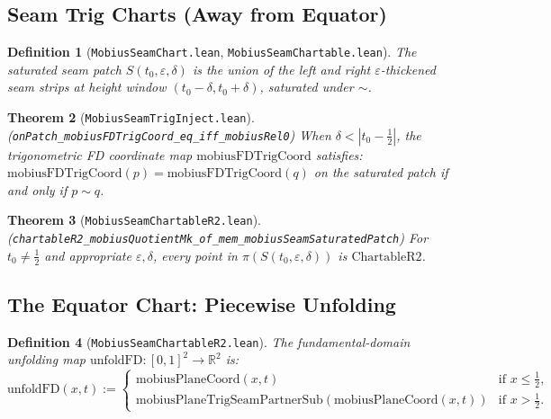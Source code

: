 \documentclass[11pt]{article}
\newtheorem{theorem}{Theorem}[section]
\newtheorem{definition}[theorem]{Definition}
\newcommand{\leanref}[1]{\texttt{\small #1}}
\begin{document}
\subsection{Seam Trig Charts (Away from Equator)}

\begin{definition}[\leanref{MobiusSeamChart.lean}, \leanref{MobiusSeamChartable.lean}]
The \emph{saturated seam patch} $S(t_0, \varepsilon, \delta)$ is the union of the left and right $\varepsilon$-thickened seam strips at height window $(t_0 - \delta, t_0 + \delta)$, saturated under $\sim$.
\end{definition}

\begin{theorem}[\leanref{MobiusSeamTrigInject.lean}]
\label{thm:trig-inject}
(\leanref{onPatch\_mobiusFDTrigCoord\_eq\_iff\_mobiusRel0})
When $\delta < |t_0 - \tfrac{1}{2}|$, the trigonometric FD coordinate map $\mathrm{mobiusFDTrigCoord}$ satisfies: $\mathrm{mobiusFDTrigCoord}(p) = \mathrm{mobiusFDTrigCoord}(q)$ on the saturated patch if and only if $p \sim q$.
\end{theorem}

\begin{theorem}[\leanref{MobiusSeamChartableR2.lean}]
\label{thm:seam-trig}
(\leanref{chartableR2\_mobiusQuotientMk\_of\_mem\_mobiusSeamSaturatedPatch})
For $t_0 \neq \tfrac{1}{2}$ and appropriate $\varepsilon, \delta$, every point in $\pi(S(t_0, \varepsilon, \delta))$ is $\mathrm{ChartableR2}$.
\end{theorem}


\subsection{The Equator Chart: Piecewise Unfolding}
\label{sec:equator}


\begin{definition}[\leanref{MobiusSeamChartableR2.lean}]
\label{def:unfold}
The \emph{fundamental-domain unfolding map} $\mathrm{unfoldFD} : [0,1]^2 \to \mathbb{R}^2$ is:
\[
  \mathrm{unfoldFD}(x, t) :=
  \begin{cases}
    \mathrm{mobiusPlaneCoord}(x, t) & \text{if } x \leq \tfrac{1}{2}, \\
    \mathrm{mobiusPlaneTrigSeamPartnerSub}(\mathrm{mobiusPlaneCoord}(x, t)) & \text{if } x > \tfrac{1}{2}.
  \end{cases}
\]
\end{definition}
\end{document}

